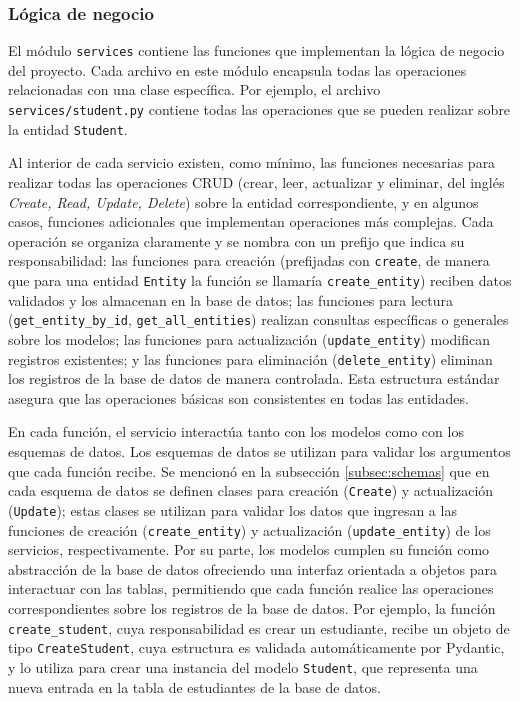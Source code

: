\subsubsection{Lógica de negocio}

El módulo \lstinline|services| contiene las funciones que implementan la lógica de negocio del proyecto. Cada archivo en este módulo encapsula todas las operaciones relacionadas con una clase específica. Por ejemplo, el archivo \lstinline|services/student.py| contiene todas las operaciones que se pueden realizar sobre la entidad \lstinline|Student|.

Al interior de cada servicio existen, como mínimo, las funciones necesarias para realizar todas las operaciones \gls{CRUD} (crear, leer, actualizar y eliminar, del inglés \textit{Create, Read, Update, Delete}) sobre la entidad correspondiente, y en algunos casos, funciones adicionales que implementan operaciones más complejas. Cada operación se organiza claramente y se nombra con un prefijo que indica su responsabilidad: las funciones para creación (prefijadas con \lstinline|create|, de manera que para una entidad \lstinline|Entity| la función se llamaría \lstinline|create_entity|) reciben datos validados y los almacenan en la base de datos; las funciones para lectura (\lstinline|get_entity_by_id|, \lstinline|get_all_entities|) realizan consultas específicas o generales sobre los modelos; las funciones para actualización (\lstinline|update_entity|) modifican registros existentes; y las funciones para eliminación (\lstinline|delete_entity|) eliminan los registros de la base de datos de manera controlada. Esta estructura estándar asegura que las operaciones básicas son consistentes en todas las entidades.

En cada función, el servicio interactúa tanto con los modelos como con los esquemas de datos. Los esquemas de datos se utilizan para validar los argumentos que cada función recibe. Se mencionó en la subsección \ref{subsec:schemas} que en cada esquema de datos se definen clases para creación (\lstinline|Create|) y actualización (\lstinline|Update|); estas clases se utilizan para validar los datos que ingresan a las funciones de creación (\lstinline|create_entity|) y actualización (\lstinline|update_entity|) de los servicios, respectivamente. Por su parte, los modelos cumplen su función como abstracción de la base de datos ofreciendo una interfaz orientada a objetos para interactuar con las tablas, permitiendo que cada función realice las operaciones correspondientes sobre los registros de la base de datos. Por ejemplo, la función \lstinline|create_student|, cuya responsabilidad es crear un estudiante, recibe un objeto de tipo \lstinline|CreateStudent|, cuya estructura es validada automáticamente por \gls{Pydantic}, y lo utiliza para crear una instancia del modelo \lstinline|Student|, que representa una nueva entrada en la tabla de estudiantes de la base de datos.

